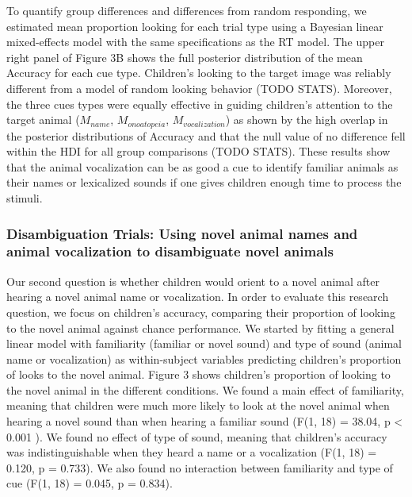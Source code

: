 \documentclass[english,floatsintext,man]{apa6}
\theoremstyle{definition}
\theoremstyle{definition}
\theoremstyle{definition}
\theoremstyle{remark}
\begin{document}
To quantify group differences and differences from random responding, we
estimated mean proportion looking for each trial type using a Bayesian
linear mixed-effects model with the same specifications as the RT model.
The upper right panel of Figure 3B shows the full posterior distribution
of the mean Accuracy for each cue type. Children's looking to the target
image was reliably different from a model of random looking behavior
(TODO STATS). Moreover, the three cues types were equally effective in
guiding children's attention to the target animal (\(M_{name}\),
\(M_{onoatopeia}\), \(M_{vocalization}\)) as shown by the high overlap
in the posterior distributions of Accuracy and that the null value of no
difference fell within the HDI for all group comparisons (TODO STATS).
These results show that the animal vocalization can be as good a cue to
identify familiar animals as their names or lexicalized sounds if one
gives children enough time to process the stimuli.

\subsubsection{Disambiguation Trials: Using novel animal names and
animal vocalization to disambiguate novel
animals}\label{disambiguation-trials-using-novel-animal-names-and-animal-vocalization-to-disambiguate-novel-animals}

Our second question is whether children would orient to a novel animal
after hearing a novel animal name or vocalization. In order to evaluate
this research question, we focus on children's accuracy, comparing their
proportion of looking to the novel animal against chance performance. We
started by fitting a general linear model with familiarity (familiar or
novel sound) and type of sound (animal name or vocalization) as
within-subject variables predicting children's proportion of looks to
the novel animal. Figure 3 shows children's proportion of looking to the
novel animal in the different conditions. We found a main effect of
familiarity, meaning that children were much more likely to look at the
novel animal when hearing a novel sound than when hearing a familiar
sound (F(1, 18) = 38.04, p \textless{} 0.001 ). We found no effect of
type of sound, meaning that children's accuracy was indistinguishable
when they heard a name or a vocalization (F(1, 18) = 0.120, p = 0.733).
We also found no interaction between familiarity and type of cue (F(1,
18) = 0.045, p = 0.834).
\end{document}
